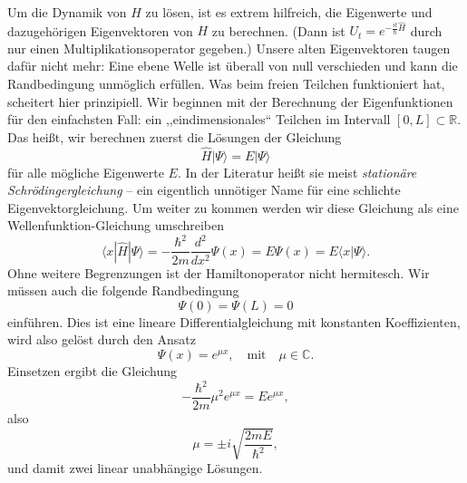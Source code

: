 Um die Dynamik von $H$ zu lösen, ist es extrem hilfreich, die Eigenwerte und dazugehörigen Eigenvektoren von $H$ zu berechnen. (Dann ist $U_t=e^{-\frac{it}{\hbar}\widehat{H}}$ durch nur einen Multiplikationsoperator gegeben.) Unsere alten Eigenvektoren taugen dafür nicht mehr: Eine ebene Welle ist überall von null verschieden und kann die Randbedingung unmöglich erfüllen. Was beim freien Teilchen funktioniert hat, scheitert hier prinzipiell. Wir beginnen mit der Berechnung der Eigenfunktionen für den einfachsten Fall: ein ,,eindimensionales`` Teilchen im Intervall $[0,L] \subset \mathbb{R}$. Das heißt, wir berechnen zuerst die Lösungen der Gleichung
\begin{equation}
	\widehat{H}|\Psi\rangle = E|\Psi\rangle
\end{equation}
für alle mögliche Eigenwerte $E$. In der Literatur heißt sie meist \emph{stationäre Schrödingergleichung} -- ein eigentlich unnötiger Name für eine schlichte Eigenvektorgleichung. Um weiter zu kommen werden wir diese Gleichung als eine Wellenfunktion-Gleichung umschreiben 
\begin{equation}
	\langle x|\widehat{H}|\Psi\rangle = -\frac{\hbar^2}{2m}\frac{d^2}{dx^2}\Psi(x) = E\Psi(x) = E\langle x|\Psi\rangle.
\end{equation}
Ohne weitere Begrenzungen ist der Hamiltonoperator nicht hermitesch. Wir müssen auch die folgende Randbedingung 
\begin{equation}
	\Psi(0) = \Psi(L) = 0
\end{equation} 
einführen. Dies ist eine lineare Differentialgleichung mit konstanten Koeffizienten, wird
also gelöst durch den Ansatz
\begin{equation}
	\Psi(x) = e^{\mu x}, \quad\text{mit}\quad \mu\in \mathbb{C}.
\end{equation}
Einsetzen ergibt die Gleichung
\begin{equation}
	-\frac{\hbar^2}{2m} \mu^2 e^{\mu x} = E e^{\mu x},
\end{equation}
also
\begin{equation}
	\mu = \pm i \sqrt{\frac{2mE}{\hbar^2}}, 
\end{equation}
und damit zwei linear unabhängige Lösungen.

